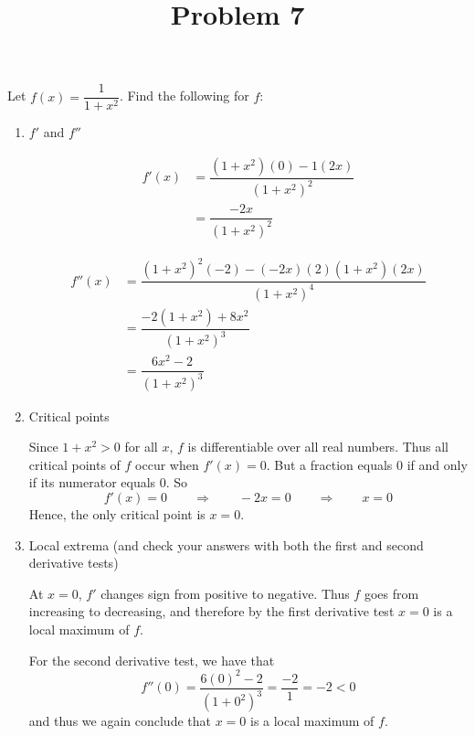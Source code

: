 \documentclass{ximera}
\title[Problem 7]{Problem 7}
\begin{document}
\begin{abstract} \end{abstract}
\maketitle


\begin{problem}
Let $f(x) = \dfrac{1}{1 + x^2}$.  Find the following for $f$:

	\begin{enumerate}
	\item  $f'$ and $f''$
\begin{explanation}
			\begin{align*}
			f'(x) &= \dfrac{(1+x^2)(0) - 1(2x)}{(1+x^2)^2} \\
			&= \dfrac{-2x}{(1+x^2)^2}
			\end{align*}
			
			\begin{align*}
			f''(x) &= \dfrac{(1+x^2)^2(-2) - (-2x)(2)(1+x^2)(2x)}{(1+x^2)^4} \\
			&= \dfrac{-2(1+x^2) + 8x^2}{(1+x^2)^3} \\
			&= \dfrac{6x^2 - 2}{(1+x^2)^3}
			\end{align*}
		\end{explanation}
	\item  Critical points
\begin{explanation}
		Since $1+x^2 > 0$ for all $x$, $f$ is differentiable over all real numbers.  Thus all critical points of $f$ occur when $f'(x) = 0$.  But a fraction equals 0 if and only if its numerator equals 0.  So
		$$ f'(x) = 0 \qquad \Longrightarrow \qquad -2x = 0 \qquad \Longrightarrow \qquad x=0 $$
		Hence, the only critical point is $x=0$.  
		\end{explanation}

	\item  Local extrema (and check your answers with both the first and second derivative tests)
\begin{explanation}
		At $x=0$, $f'$ changes sign from positive to negative.  Thus $f$ goes from increasing to decreasing, and therefore by the first derivative test $x=0$ is a local maximum of $f$.  
		
		For the second derivative test, we have that
		$$ f''(0) = \dfrac{6(0)^2 - 2}{(1+0^2)^3} = \dfrac{-2}{1} = -2 < 0 $$
		and thus we again conclude that $x=0$ is a local maximum of $f$.
		\end{explanation}


\end{enumerate}
\end{problem}
\end{document}

